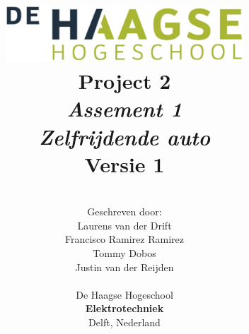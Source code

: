 \title{
\includegraphics[width=3.5in]{IMG/HHS.png} \\
\vspace*{2in}
\textbf{Project 2}\\
\textit{Assement 1}\\
\textit{Zelfrijdende auto}\\
Versie 1
}
\author{
\vspace*{2.5in} \\
  Geschreven door:\\
  Laurens van der Drift\\
  Francisco Ramirez Ramirez\\
  Tommy Dobos\\
  Justin van der Reijden\\
		\vspace*{0.5in} \\
		De Haagse Hogeschool\\
        \textbf{Elektrotechniek}\\
        Delft, Nederland
       } 